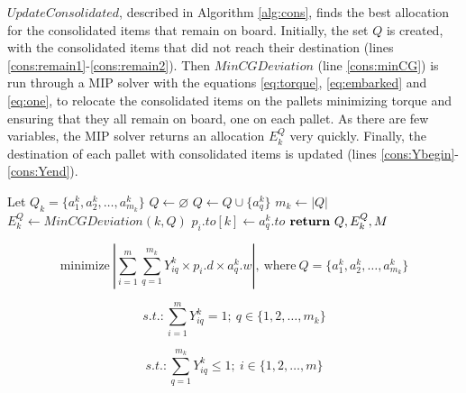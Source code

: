 \documentclass[preprint,authoryear]{elsarticle}
\begin{document}
$UpdateConsolidated$, described in Algorithm \ref{alg:cons}, finds the best allocation for the consolidated items that remain on board. Initially, the set $Q$\/ is created, with the consolidated items that did not reach their destination (lines \ref{cons:remain1}-\ref{cons:remain2}). Then $MinCGDeviation$\/ (line \ref{cons:minCG}) is run through a MIP solver with the equations \ref{eq:torque}, \ref{eq:embarked} and \ref {eq:one}, to relocate the consolidated items on the pallets minimizing torque and ensuring that they all remain on board, one on each pallet. As there are few variables, the MIP solver returns an allocation $E^Q_k$\/ very quickly. Finally, the destination of each pallet with consolidated items is updated (lines \ref{cons:Ybegin}-\ref{cons:Yend}).

\begin{algorithm}[H]
	\caption{$UpdateConsolidated(k)$}  \label{alg:cons}
	\begin{algorithmic}[1]

		\State Let $Q_k  = \{ a^k_1, a^k_2, \ldots, a^k_{m_k} \}$ 
		\State $Q \gets \varnothing$ \label{cons:remain1}
				\State $Q \gets Q \cup \{a_q^k\}$
			\EndIf
		\EndFor	 
		\State $m_k \gets |Q|$ \label{cons:remain2}
		\State $E^Q_k \gets MinCGDeviation(k, Q)$ \label{cons:minCG}
		 \label{cons:Ybegin}
					\State $p_i.to[k] \gets a_q^k.to$
				\EndIf
			\EndFor		
		\EndFor \label{cons:Yend}
		\State ${\bf return}\ Q, E^Q_k, M$ 
	\end{algorithmic}
\end{algorithm}




\begin{equation} \label{eq:torque}
	\mbox{minimize}\ | \sum_{i=1}^{m} \sum_{q=1}^{m_k} Y^k_{iq} \times p_i.d \times a_q^k.w |,\ \mbox{where}\ Q  = \{ a^k_1, a^k_2, \ldots, a^k_{m_k} \} 
\end{equation}

\begin{equation} \label{eq:embarked}
	s.t.: \sum_{i=1}^{m} Y^k_{iq} = 1;\ q \in \{1,2,\ldots,m_k\}
\end{equation}

\begin{equation} \label{eq:one}
	s.t.: \sum_{q=1}^{m_k} Y^k_{iq} \leq 1;\ i \in \{1,2,\ldots,m\}
\end{equation}
\end{document}
